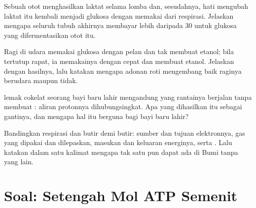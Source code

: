 \begin{exercise}[$\star\star\star$]\label{exo:g12:respiration-fermentation:12}
Sebuah otot menghasilkan laktat selama lomba dan, sesudahnya, hati
mengubah laktat itu kembali menjadi glukosa dengan memakai  dari
respirasi. Jelaskan mengapa seluruh tubuh akhirnya membayar lebih
daripada 30  untuk glukosa yang difermentasikan otot itu.
\end{exercise}

\begin{exercise}[$\star\star\star$]\label{exo:g12:respiration-fermentation:13}
Ragi di udara memakai glukosa dengan pelan dan tak membuat etanol; bila
tertutup rapat, ia memakainya dengan cepat dan membuat etanol. Jelaskan
dengan hasilnya, lalu katakan mengapa adonan roti mengembang baik
raginya berudara maupun tidak.
\end{exercise}

\begin{exercise}[$\star\star\star$]\label{exo:g12:respiration-fermentation:14}
 lemak cokelat seorang bayi baru lahir mengandung  yang
rantainya berjalan tanpa membuat : aliran protonnya dihubungsingkat.
Apa yang dihasilkan  itu sebagai gantinya, dan mengapa hal itu
berguna bagi bayi baru lahir?
\end{exercise}

\begin{exercise}[$\star\star\star$]\label{exo:g12:respiration-fermentation:15}
Bandingkan respirasi dan  butir demi butir: sumber dan
tujuan elektronnya, gas yang dipakai dan dilepaskan, masukan dan
keluaran energinya, serta . Lalu katakan dalam satu kalimat
mengapa tak satu pun dapat ada di Bumi tanpa yang lain.
\end{exercise}

\section{Soal: Setengah Mol ATP Semenit}

